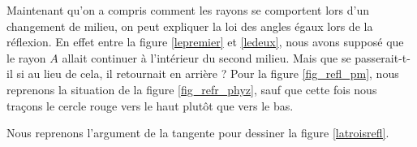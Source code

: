 \documentclass[a4paper,12pt]{book}
\newcommand{\pstTransHom}[5]{%
\pstTranslation{#1}{#2}{#3}[inter]
\pstHomO[HomCoef=#4]{#3}{inter}[#5]
}
\newcommand{\pstTangenteOPM}[5]{%
\pstMiddleAB{#1}{#3}{inter}
\pstInterCC{#1}{#2}{inter}{#3}{#4}{#5}
}
\newcommand{\pstDecompForce}[8]{%
  \psset{PointSymbol=none, PointName=none}
\pstTranslation{#3}{#4}{#1}[ibBu]
\pstTranslation{#5}{#6}{#1}[ibBd]

\pstTranslation{#3}{#4}{#2}[jbBu]
\pstTranslation{#5}{#6}{#2}[jbBd]

\pstInterLL{#2}{jbBd}{#1}{ibBu}{#7}
\pstInterLL{#2}{jbBu}{#1}{ibBd}{#8}
}
\newcommand{\pstDioptre}[8][Diinter]{%
  \psset{PointSymbol=none, PointName=none}
	\pstGeonode(#2){DiO}(#3){DiP}(#4){DiRi}
	\pstRotation[RotAngle=90]{DiO}{DiP}[DiQ]				%
   	\pstDecompForce{DiO}{DiRi}{DiO}{DiP}{DiO}{DiQ}{DiRix}{DiRiy}		%
  \FPeval{Dicoefrel}{#5/#6}
	\pstTransHom{DiRi}{DiRiy}{DiO}{\Dicoefrel}{DiRex}			%

   	\pstTranslation{DiO}{DiRex}{DiQ}[DiR]
   	\pstInterLC{DiRex}{DiR}{DiO}{DiRi}{#8}{#1}				%

	\pstTranslation{DiRi}{DiRiy}{DiRiy}[#7]					%
}
\theoremstyle{mes_exemples}	\newtheorem{exemple}[numtho]{Exemple}
\theoremstyle{mes_tho}
\begin{document}
Maintenant qu'on a compris comment les rayons se comportent lors d'un changement de milieu, on peut expliquer la loi des angles égaux lors de la réflexion. En effet entre la figure \ref{lepremier} et \ref{ledeux}, nous avons supposé que le rayon $A$ allait continuer à l'intérieur du second milieu. Mais que se passerait-t-il si au lieu de cela, il retournait en arrière ? Pour la figure \ref{fig_refl_pm}, nous reprenons la situation de la figure \ref{fig_refr_phyz}, sauf que cette fois nous traçons le cercle rouge vers le haut plutôt que vers le bas.

Nous reprenons l'argument de la tangente pour dessiner la figure \ref{latroisrefl}.

\newcommand{\prefigcalcrefl}{%
\pstGeonode(0,0){A}(2,0){B}			%
\pstHomO[HomCoef=-1]{A}{B}[B']			
\pstHomO[HomCoef=2]{A}{B}[A']
\pstRotation[RotAngle=-70]{A}{B'}[r1]		%
\pstTransHom{A}{r1}{B}{1}{r2}
\pstRotation[RotAngle=90]{A}{r1}[pl]
\pstInterLL{A}{pl}{B}{r2}{C}
\pstTransHom{C}{B}{A}{1}{Cl}			%
\pstInterLC{B'}{A'}{A}{Cl}{C1}{C2}
\pstTangenteOPM{A}{Cl}{B}{t2}{t1}
}
\end{document}
